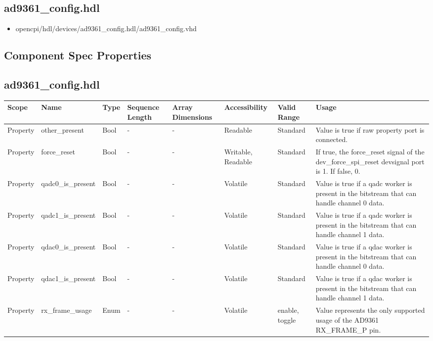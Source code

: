 \documentclass{article}
\def\comp{ad9361\_config}
\begin{document}
\subsection*{\comp.hdl}
\begin{itemize}
  \item opencpi/hdl/devices/ad9361\_config.hdl/ad9361\_config.vhd
\end{itemize}
\begin{landscape}

  \section*{Component Spec Properties}
  \begin{scriptsize}
  \subsection*{\comp.hdl}
      \begin{tabular}{|p{2cm}|p{5cm}|p{1cm}|p{2cm}|p{2cm}|p{1.75cm}|p{1.5cm}|p{5.24cm}|}
      \hline
      \rowcolor{blue}
      Scope    & Name  & Type  & Sequence Length & Array Dimensions & Accessibility & Valid Range & Usage \\
      \hline
      Property & other\_present & Bool & - & - & Readable & Standard & Value is true if raw property port is connected. \\
      \hline
      Property & force\_reset & Bool & - & - & Writable, Readable  & Standard & If true, the force\_reset signal of the dev\_force\_spi\_reset devsignal port is 1. If false, 0. \\
      \hline
      Property & qadc0\_is\_present & Bool & - & - & Volatile & Standard & Value is true if a qadc worker is present in the bitstream that can handle channel 0 data. \\
      \hline
      Property & qadc1\_is\_present & Bool & - & - & Volatile & Standard & Value is true if a qadc worker is present in the bitstream that can handle channel 1 data. \\
      \hline
      Property & qdac0\_is\_present & Bool & - & - & Volatile & Standard & Value is true if a qdac worker is present in the bitstream that can handle channel 0 data.  \\
      \hline
      Property & qdac1\_is\_present & Bool & - & - & Volatile & Standard & Value is true if a qdac worker is present in the bitstream that can handle channel 1 data. \\
      \hline
      Property & rx\_frame\_usage & Enum & - & - & Volatile & enable, toggle & Value represents the only supported usage of the AD9361 RX\_FRAME\_P pin. \\

\end{tabular}
\end{scriptsize}
\end{landscape}
\end{document}
